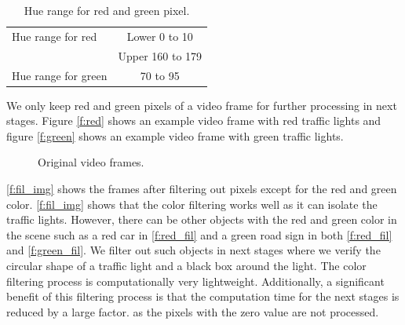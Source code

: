 \begin{table}[h!]
  \centering
  \caption{Hue range for red and green pixel.}
  \label{t:hue_range}
  \begin{tabular}{  l  c  }
    \rowcolor{gray!50}

    \hline
    Hue range for red & Lower 0 to 10 \\ \cline{2-2}
    & Upper 160 to 179 \\
    \hline \hline
    Hue range for green & 70 to 95 \\
    \hline
  \end{tabular}
\end{table}


We only keep red and green pixels of a video frame for further processing in next stages.
Figure \ref{f:red} shows an example video frame with red traffic lights and figure \ref{f:green} shows an example video frame with green traffic lights.

\begin{figure}[!ht]
\centering
{}
\hfill
{}
\caption{Original video frames.}
\label{f:org_img}
\end{figure}


\ref{f:fil_img} shows the frames after filtering out pixels except for the red and green color. 
\ref{f:fil_img} shows that the color filtering works well as it can isolate the traffic lights. 
However, there can be other objects with the red and green color in the scene such as a red car in \ref{f:red_fil} and a green road sign in both \ref{f:red_fil} and \ref{f:green_fil}.
We filter out such objects in next stages where we verify the circular shape of a traffic light and a black box around the light.
The color filtering process is computationally very lightweight.
Additionally, a significant benefit of this filtering process is that the computation time for the next stages is reduced by a large factor.
as the pixels with the zero value are not processed.



